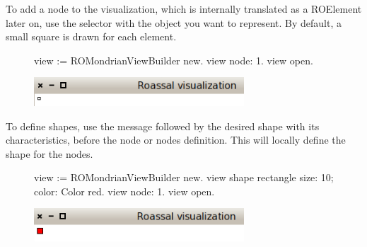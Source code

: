\documentclass[a4paper,10pt,twoside]{book}
\begin{document}
To add a node to the visualization, which is internally translated as a ROElement later on, use the selector  with the object you want to represent. By default, a small square is drawn for each element.

\begin{figure}[H]
      \begin{minipage}[t]{1\textwidth}
      \vspace{0pt}
\begin{code}{}
view := ROMondrianViewBuilder new.
view node: 1.
view open.
\end{code}
   \end{minipage}
   \hfill
   \begin{minipage}[t]{1\textwidth}
	 \vspace{0pt} \raggedright
       \centering
		\includegraphics[width=0.7\textwidth]{mondrian1}
   \end{minipage}
\label{fig:mondrian1}
\end{figure} 




To define shapes, use the  message followed by the desired shape with its characteristics, before the node or nodes definition. This will locally define the shape for the nodes.

\begin{figure}[H]
      \begin{minipage}[t]{1\textwidth}
      \vspace{0pt}
\begin{code}{}
view := ROMondrianViewBuilder new.
view shape rectangle 
	size: 10;
	color: Color red.
view node: 1.
view open.
\end{code}
   \end{minipage}
   \hfill
   \begin{minipage}[t]{1\textwidth}
	 \vspace{0pt} \raggedright
       \centering
		\includegraphics[width=0.7\textwidth]{mondrian2}
   \end{minipage}
\label{fig:mondrian2}
\end{figure} 
\end{document}
